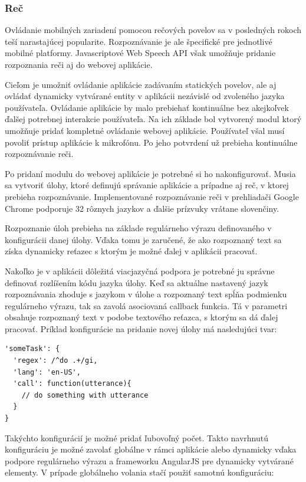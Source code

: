 \subsubsection{Reč} %
\label{ssub:re_}

Ovládanie mobilných zariadení pomocou rečových povelov sa v posledných rokoch teší narastajúcej popularite. Rozpoznávanie je ale špecifické pre jednotlivé mobilné platformy. Javascriptové Web Speech API však umožňuje pridanie rozpoznania reči aj do webovej aplikácie. 

Cieľom je umožniť ovládanie aplikácie zadávaním statických povelov, ale aj ovládať dynamicky vytvárané entity v aplikácii nezávislé od zvoleného jazyka používateľa. Ovládanie aplikácie by malo prebiehať kontinuálne bez akejkoľvek ďalšej potrebnej interakcie používateľa. Na ich základe bol vytvorený modul ktorý umožňuje pridať kompletné ovládanie webovej aplikácie. Používateľ všal musí povoliť prístup aplikácie k mikrofónu. Po jeho potvrdení už prebieha kontinuálne rozpoznávanie reči.

Po pridaní modulu do webovej aplikácie je potrebné si ho nakonfigurovať. Musia sa vytvoriť úlohy, ktoré definujú správanie aplikácie a prípadne aj reč, v ktorej prebieha rozpoznávanie. Implementované rozpoznávanie reči v prehliadači Google Chrome podporuje 32 rôznych jazykov a ďalšie prízvuky vrátane slovenčiny.

Rozpoznanie úloh prebieha na základe regulárneho výrazu definovaného v konfigurácii danej úlohy. Vďaka tomu je zaručené, že ako rozpoznaný text sa získa dynamicky reťazec s ktorým je možné ďalej v aplikácii pracovať. 

Nakoľko je v aplikácii dôležitá viacjazyčná podpora je potrebné ju správne definovať rozlíšením kódu jazyka úlohy. Keď sa aktuálne nastavený jazyk rozpoznávania zhoduje s jazykom v úlohe a rozpoznaný text spĺňa podmienku regulárneho výrazu, tak sa zavolá asociovaná callback funkcia. Tá v parametri obsahuje rozpoznaný text v podobe textového reťazca, s ktorým sa dá ďalej pracovať. Príklad konfigurácie na pridanie novej úlohy má nasledujúci tvar:

\begin{lstlisting}
'someTask': {
  'regex': /^do .+/gi,
  'lang': 'en-US',
  'call': function(utterance){
    // do something with utterance
  }
}
\end{lstlisting}


Takýchto konfigurácií je možné pridať ľubovoľný počet. Takto navrhnutú konfiguráciu je možné zavolať globálne v rámci aplikácie alebo dynamicky vďaka podpore regulárneho výrazu a frameworku AngularJS pre dynamicky vytvárané elementy. V prípade globálneho volania stačí použiť samotnú konfiguráciu:

